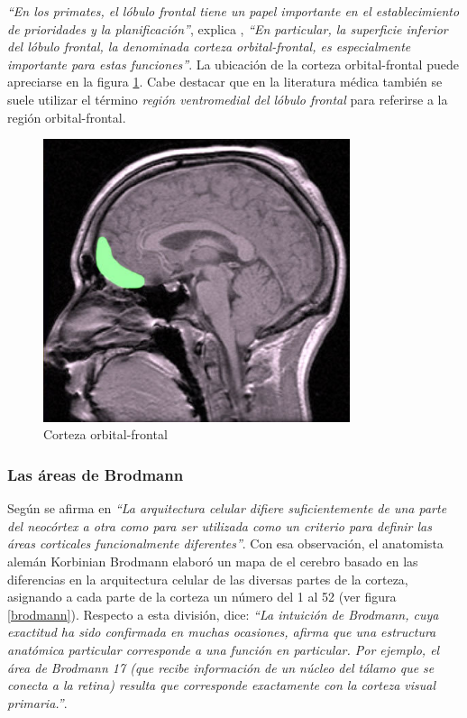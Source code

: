 {\it ``En los primates, el lóbulo frontal tiene un papel importante en el establecimiento de prioridades y la planificación''}, explica \cite{JohnAllman2000}, {\it ``En particular, la superficie inferior del lóbulo frontal, la denominada corteza orbital-frontal, es especialmente importante para estas funciones''}. La ubicación de la corteza orbital-frontal puede apreciarse en la figura \ref{orbital-frontal}. Cabe destacar que en la literatura médica también se suele utilizar el término {\it región ventromedial del lóbulo frontal} para referirse a la región orbital-frontal.

\begin{figure}[h]
  \begin{center}
    \includegraphics[width=9cm]{images/orbital-frontal.jpg}
    \caption{Corteza orbital-frontal}
    \label{orbital-frontal}
  \end{center}
\end{figure}



\subsubsection{Las áreas de Brodmann}

Según se afirma en \cite{InstituteofNeurosciencesMentalHealth} {\it ``La arquitectura celular difiere suficientemente de una parte del neocórtex a otra como para ser utilizada como un criterio para definir las áreas corticales funcionalmente diferentes''}. Con esa observación, el anatomista alemán Korbinian Brodmann elaboró un mapa de el cerebro basado en las diferencias en la arquitectura celular de las diversas partes de la corteza, asignando a cada parte de la corteza un número del 1 al 52 (ver figura \ref{brodmann}). Respecto a esta división, \cite{InstituteofNeurosciencesMentalHealth} dice: {\it ``La intuición de Brodmann, cuya exactitud ha sido confirmada en muchas ocasiones, afirma que una estructura anatómica particular corresponde a una función en particular. Por ejemplo, el área de Brodmann 17 (que recibe información de un núcleo del tálamo que se conecta a la retina) resulta que corresponde exactamente con la corteza visual primaria.''}. 

